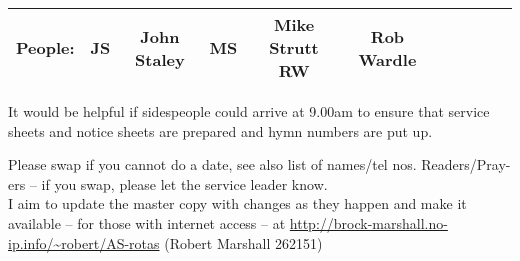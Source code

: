 \documentclass[10pt]{article}
\begin{document}
\begin{center}
\vspace{1em}
\begin{tabular}{|c|c|c|c|c|c|c|c|c|c|c|}\hline
{\bf People: } &
 JS & John Staley & 
MS & Mike Strutt
RW & Rob Wardle \\
     \hline
  \end{tabular}
\end{center}
\begin{minipage}{0.7\textwidth}
{\footnotesize It would be helpful if sidespeople 
could arrive at 9.00am to ensure that service sheets and notice sheets are 
prepared and hymn numbers are put up.

Please swap if you cannot do a date, see also list of names/tel nos.
Readers/Pray-ers -- if you swap, please let the service leader know.\\
I aim to update the master copy with changes as they
happen and make it available -- for those with internet access
\linebreak -- at
\url{http://brock-marshall.no-ip.info/~robert/AS-rotas}
(Robert Marshall 262151)}
\end{minipage}
\end{document}

